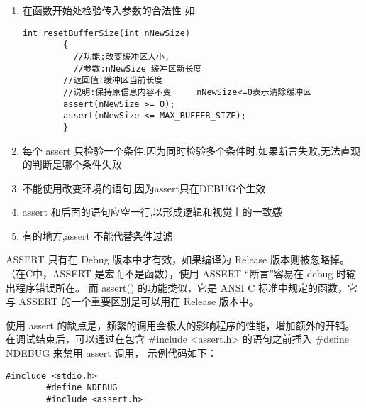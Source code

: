 \begin{enumerate}
    \item 在函数开始处检验传入参数的合法性
          如:
          \begin{lstlisting}[frame=shadowbox]
        int resetBufferSize(int nNewSize)
        {
          //功能:改变缓冲区大小,
          //参数:nNewSize 缓冲区新长度
        //返回值:缓冲区当前长度
        //说明:保持原信息内容不变     nNewSize<=0表示清除缓冲区
        assert(nNewSize >= 0);
        assert(nNewSize <= MAX_BUFFER_SIZE);
        }
        \end{lstlisting}
    \item 每个 assert 只检验一个条件,因为同时检验多个条件时,如果断言失败,无法直观的判断是哪个条件失败

    \item 不能使用改变环境的语句,因为assert只在DEBUG个生效

    \item assert 和后面的语句应空一行,以形成逻辑和视觉上的一致感

    \item 有的地方,assert 不能代替条件过滤
\end{enumerate}



ASSERT 只有在 Debug 版本中才有效，如果编译为 Release 版本则被忽略掉。
（在C中，ASSERT 是宏而不是函数），使用 ASSERT “断言”容易在 debug 时输出程序错误所在。
而 assert() 的功能类似，它是 ANSI C 标准中规定的函数，它与 ASSERT 的一个重要区别是可以用在 Release 版本中。

使用 assert 的缺点是，频繁的调用会极大的影响程序的性能，增加额外的开销。
在调试结束后，可以通过在包含 \#include <assert.h> 的语句之前插入 \#define NDEBUG 来禁用 assert 调用，
示例代码如下：
\begin{lstlisting}[frame=shadowbox]
        #include <stdio.h>
        #define NDEBUG
        #include <assert.h>
    \end{lstlisting}

\newpage
